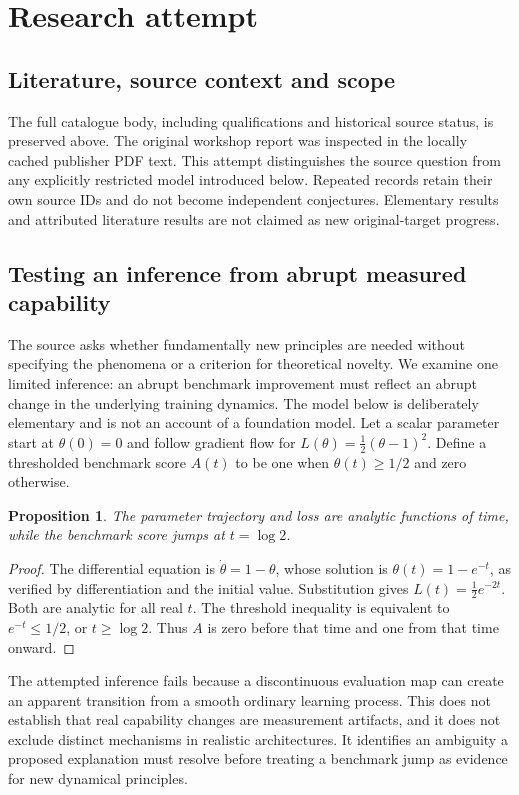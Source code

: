 \documentclass[11pt]{article}
\newtheorem{proposition}{Proposition}
\begin{document}
\section{Research attempt}
\subsection{Literature, source context and scope}
The full catalogue body, including qualifications and historical source status, is preserved above. The original workshop report was inspected in the locally cached publisher PDF text. This attempt distinguishes the source question from any explicitly restricted model introduced below. Repeated records retain their own source IDs and do not become independent conjectures. Elementary results and attributed literature results are not claimed as new original-target progress.

\subsection{Testing an inference from abrupt measured capability}
The source asks whether fundamentally new principles are needed without specifying the phenomena or a criterion for theoretical novelty. We examine one limited inference: an abrupt benchmark improvement must reflect an abrupt change in the underlying training dynamics. The model below is deliberately elementary and is not an account of a foundation model.
Let a scalar parameter start at $\theta(0)=0$ and follow gradient flow for $L(\theta)=\tfrac12(\theta-1)^2$. Define a thresholded benchmark score $A(t)$ to be one when $\theta(t)\ge1/2$ and zero otherwise.
\begin{proposition}
The parameter trajectory and loss are analytic functions of time, while the benchmark score jumps at $t=\log2$.
\end{proposition}
\begin{proof}
The differential equation is $\dot\theta=1-\theta$, whose solution is $\theta(t)=1-e^{-t}$, as verified by differentiation and the initial value. Substitution gives $L(t)=\tfrac12e^{-2t}$. Both are analytic for all real $t$. The threshold inequality is equivalent to $e^{-t}\le1/2$, or $t\ge\log2$. Thus $A$ is zero before that time and one from that time onward.
\end{proof}
The attempted inference fails because a discontinuous evaluation map can create an apparent transition from a smooth ordinary learning process. This does not establish that real capability changes are measurement artifacts, and it does not exclude distinct mechanisms in realistic architectures. It identifies an ambiguity a proposed explanation must resolve before treating a benchmark jump as evidence for new dynamical principles.
\end{document}
